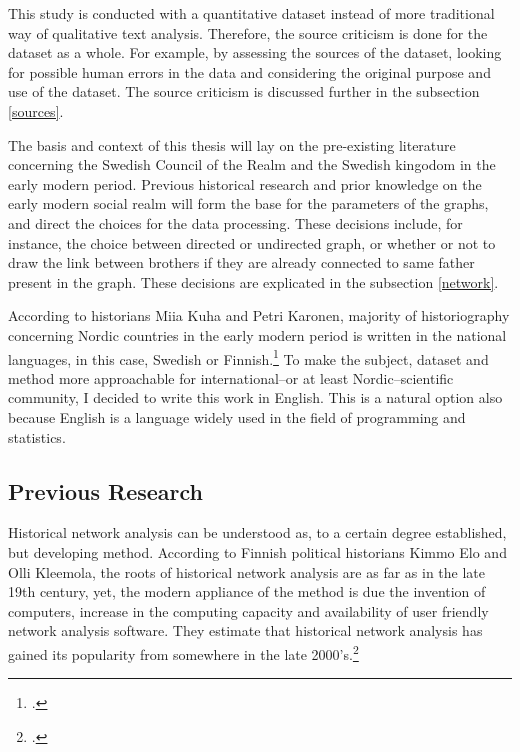 This study is conducted with a quantitative dataset instead of more traditional way of qualitative text analysis. Therefore, the source criticism is done for the dataset as a whole. For example, by assessing the sources of the dataset, looking for possible human errors in the data and considering the original purpose and use of the dataset. The source criticism is discussed further in the subsection \ref{sources}.

The basis and context of this thesis will lay on the pre-existing literature concerning the Swedish Council of the Realm and the Swedish kingodom in the early modern period. Previous historical research and prior knowledge on the early modern social realm will form the base for the parameters of the graphs, and direct the choices for the data processing. These decisions include, for instance, the choice between directed or undirected graph, or whether or not to draw the link between brothers if they are already connected to same father present in the graph. These decisions are explicated in the subsection \ref{network}.

According to historians Miia Kuha and Petri Karonen, majority of historiography concerning Nordic countries in the early modern period is written in the national languages, in this case, Swedish or Finnish.\footcite[p. 6.]{kuha-ja-karonen} To make the subject, dataset and method more approachable for international–or at least Nordic–scientific community, I decided to write this work in English. This is a natural option also because English is a language widely used in the field of programming and statistics.

\subsection{Previous Research}
Historical network analysis can be understood as, to a certain degree established, but developing method. According to Finnish political historians Kimmo Elo and Olli Kleemola, the roots of historical network analysis are as far as in the late 19th century, yet, the modern appliance of the method is due the invention of computers, increase in the computing capacity and availability of user friendly network analysis software. They estimate that historical network analysis has gained its popularity from somewhere in the late 2000's.\footcite[pp. 415-417.]{eloAklee15} 

